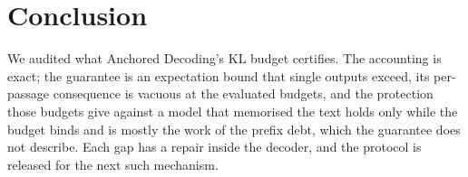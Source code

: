 \section{Conclusion}\label{sec:conclusion}
We audited what Anchored Decoding's KL budget certifies. The accounting is exact; the guarantee is an expectation bound that single outputs exceed, its per-passage consequence is vacuous at the evaluated budgets, and the protection those budgets give against a model that memorised the text holds only while the budget binds and is mostly the work of the prefix debt, which the guarantee does not describe. Each gap has a repair inside the decoder, and the protocol is released for the next such mechanism.
